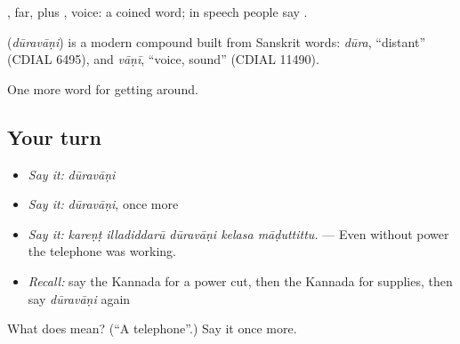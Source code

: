 , far, plus , voice: a coined word; in speech people say .

\begin{cousinweb}
\textbf{} (\emph{dūravāṇi}) is a modern compound built from Sanskrit words: \emph{dūra}, \textquotedblleft{}distant\textquotedblright{} (CDIAL 6495), and \emph{vāṇī}, \textquotedblleft{}voice, sound\textquotedblright{} (CDIAL 11490).
\end{cousinweb}

\begin{grammarlens}[title={What you've built}]
One more word for getting around.
\end{grammarlens}

\subsection*{Your turn}
\begin{itemize}
\raggedright
  \item \emph{Say it:} \emph{dūravāṇi}
  \item \emph{Say it:} \emph{dūravāṇi}, once more
  \item \emph{Say it:} \emph{kareṇṭ illadiddarū dūravāṇi kelasa māḍuttittu.} — Even without power the telephone was working.
  \item \emph{Recall:} say the Kannada for a power cut, then the Kannada for supplies, then say \emph{dūravāṇi} again
\end{itemize}

\begin{tcolorbox}[breakable,colback=teal!4,colframe=teal!35!black,title={Before you move on}]
What does  mean? (\textquotedblleft{}A telephone\textquotedblright{}.) Say it once more.
\end{tcolorbox}
